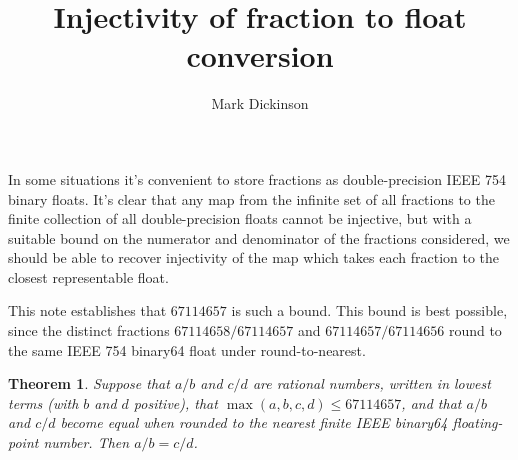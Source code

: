 \documentclass[a4paper]{article}
\title{Injectivity of fraction to float conversion}
\author{Mark Dickinson}
\theoremstyle{plain}
\newtheorem{theorem}{Theorem}
\begin{document}
\maketitle

In some situations it's convenient to store fractions as double-precision IEEE
754 binary floats. It's clear that any map from the infinite set of all
fractions to the finite collection of all double-precision floats cannot be
injective, but with a suitable bound on the numerator and denominator of the
fractions considered, we should be able to recover injectivity of the map which
takes each fraction to the closest representable float.

This note establishes that $67114657$ is such a bound. This bound is best
possible, since the distinct fractions $67114658 / 67114657$ and $67114657 /
67114656$ round to the same IEEE 754 binary64 float under round-to-nearest.

\begin{theorem}
    Suppose that $a/b$ and $c/d$ are rational numbers, written in lowest terms
    (with $b$ and $d$ positive), that $\max(a, b, c, d) \le 67114657$, and that
    $a/b$ and $c/d$ become equal when rounded to the nearest finite IEEE
    binary64 floating-point number. Then $a/b = c/d$.
\end{theorem}
\end{document}
